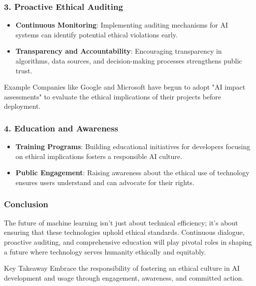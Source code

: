 \documentclass[aspectratio=169]{beamer}
\begin{document}
\begin{frame}[fragile]
    \frametitle{3. Proactive Ethical Auditing}
    \begin{itemize}
        \item \textbf{Continuous Monitoring}: Implementing auditing mechanisms for AI systems can identify potential ethical violations early.
        \item \textbf{Transparency and Accountability}: Encouraging transparency in algorithms, data sources, and decision-making processes strengthens public trust.
    \end{itemize}
    
    \begin{block}{Example}
        Companies like Google and Microsoft have begun to adopt "AI impact assessments" to evaluate the ethical implications of their projects before deployment.
    \end{block}
\end{frame}

\begin{frame}[fragile]
    \frametitle{4. Education and Awareness}
    \begin{itemize}
        \item \textbf{Training Programs}: Building educational initiatives for developers focusing on ethical implications fosters a responsible AI culture.
        \item \textbf{Public Engagement}: Raising awareness about the ethical use of technology ensures users understand and can advocate for their rights.
    \end{itemize}
\end{frame}

\begin{frame}[fragile]
    \frametitle{Conclusion}
    The future of machine learning isn't just about technical efficiency; it's about ensuring that these technologies uphold ethical standards. 
    Continuous dialogue, proactive auditing, and comprehensive education will play pivotal roles in shaping a future where technology serves humanity ethically and equitably.

    \begin{block}{Key Takeaway}
        Embrace the responsibility of fostering an ethical culture in AI development and usage through engagement, awareness, and committed action.
    \end{block}
\end{frame}
\end{document}

